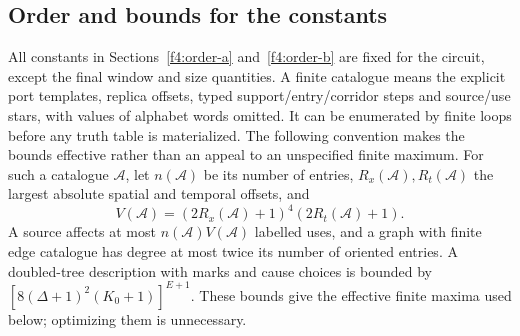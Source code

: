 \subsection{Order and bounds for the constants}\label{f4:constants}
All constants in Sections~\ref{f4:order-a} and~\ref{f4:order-b} are fixed
for the circuit, except the final window and size quantities. A finite
catalogue means the explicit port templates, replica offsets, typed
support/entry/corridor steps and source/use stars, with values of
alphabet words omitted. It can be enumerated by finite loops before
any truth table is materialized. The following convention makes the
bounds effective rather than an appeal to an unspecified finite maximum.
For such a catalogue \(\mathcal A\), let \(n(\mathcal A)\) be its
number of entries, \(R_x(\mathcal A),R_t(\mathcal A)\) the largest
absolute spatial and temporal offsets, and
\[
 V(\mathcal A)=(2R_x(\mathcal A)+1)^4(2R_t(\mathcal A)+1).
\]
A source affects at most \(n(\mathcal A)V(\mathcal A)\) labelled
uses, and a graph with finite edge catalogue has degree at most twice
its number of oriented entries. A doubled-tree description with marks
and cause choices is bounded by
\([8(\Delta+1)^2(K_0+1)]^{E+1}\). These bounds give the effective finite maxima used below; optimizing them is unnecessary.

